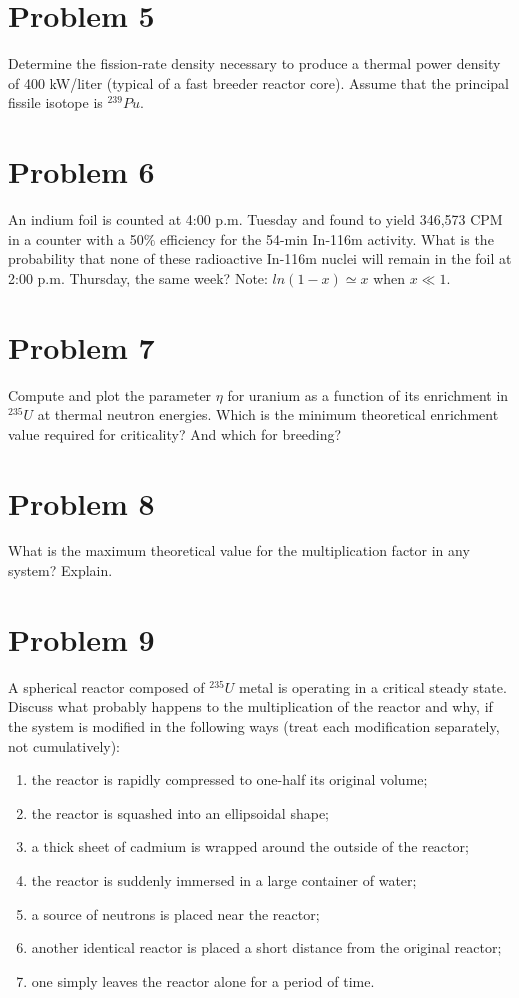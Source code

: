 \documentclass{article}
\begin{document}
\section*{Problem 5}

Determine the fission-rate density necessary to produce a thermal power density of 400 kW/liter
(typical of a fast breeder reactor core). Assume that the principal fissile isotope is $^{239}Pu$.

\section*{Problem 6}

An indium foil is counted at 4:00 p.m. Tuesday and found to yield 346,573 CPM in a counter
with a 50$\%$ efficiency for the 54-min In-116m activity. What is the probability that none of
these radioactive In-116m nuclei will remain in the foil at 2:00 p.m. Thursday, the same week?
Note: $ln (1- x) \simeq x $ when $ x \ll 1$.


\section*{Problem 7}

Compute and plot the parameter $\eta$ for uranium as a function of its enrichment in $^{235}U$ at
thermal neutron energies. Which is the minimum theoretical enrichment value required for
criticality? And which for breeding?

\section*{Problem 8}

What is the maximum theoretical value for the multiplication factor in any system? Explain.

\section*{Problem 9}

A spherical reactor composed of $^{235}U$ metal is operating in a critical steady state. Discuss
what probably happens to the multiplication of the reactor and why, if the system is modified
in the following ways (treat each modification separately, not cumulatively):
\begin{enumerate}[label=(\alph*)]
\item the reactor is rapidly compressed to one-half its original volume;
\item the reactor is squashed into an ellipsoidal shape;
\item a thick sheet of cadmium is wrapped around the outside of the reactor;
\item the reactor is suddenly immersed in a large container of water;
\item a source of neutrons is placed near the reactor;
\item another identical reactor is placed a short distance from the original reactor;
\item one simply leaves the reactor alone for a period of time.
\end{enumerate}
\end{document}
